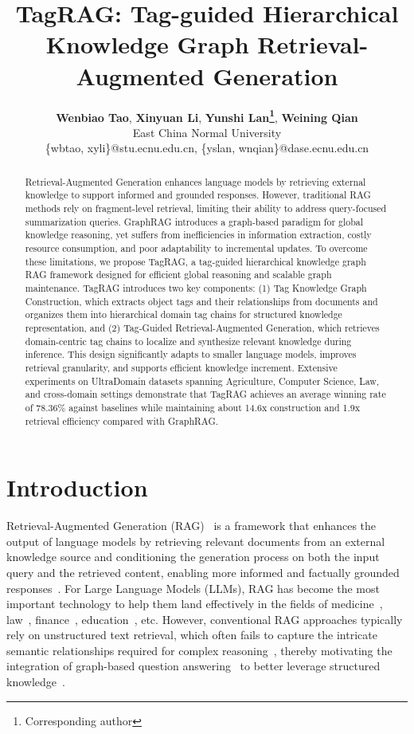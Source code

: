 \documentclass[11pt]{article}
\title{TagRAG: Tag-guided Hierarchical Knowledge Graph Retrieval-Augmented Generation}
\author{
 \textbf{Wenbiao Tao},
 \textbf{Xinyuan Li},
 \textbf{Yunshi Lan\thanks{Corresponding author}},
 \textbf{Weining Qian}
\\
 East China Normal University
\\
 \{wbtao, xyli\}@stu.ecnu.edu.cn, \{yslan, wnqian\}@dase.ecnu.edu.cn
}
\begin{document}
\maketitle


\begin{abstract}
Retrieval-Augmented Generation enhances language models by retrieving external knowledge to support informed and grounded responses. However, traditional RAG methods rely on fragment-level retrieval, limiting their ability to address query-focused summarization queries. GraphRAG introduces a graph-based paradigm for global knowledge reasoning, yet suffers from inefficiencies in information extraction, costly resource consumption, and poor adaptability to incremental updates. To overcome these limitations, we propose TagRAG, a tag-guided hierarchical knowledge graph RAG framework designed for efficient global reasoning and scalable graph maintenance. TagRAG introduces two key components: (1) Tag Knowledge Graph Construction, which extracts object tags and their relationships from documents and organizes them into hierarchical domain tag chains for structured knowledge representation, and (2) Tag-Guided Retrieval-Augmented Generation, which retrieves domain-centric tag chains to localize and synthesize relevant knowledge during inference. This design significantly adapts to smaller language models, improves retrieval granularity, and supports efficient knowledge increment. Extensive experiments on UltraDomain datasets spanning Agriculture, Computer Science, Law, and cross-domain settings demonstrate that TagRAG achieves an average winning rate of 78.36\% against baselines while maintaining about 14.6x construction and 1.9x retrieval efficiency compared with GraphRAG.
\end{abstract}





\section{Introduction}
Retrieval-Augmented Generation (RAG)~\cite{lewis2020retrieval} is a framework that enhances the output of language models by retrieving relevant documents from an external knowledge source and conditioning the generation process on both the input query and the retrieved content, enabling more informed and factually grounded responses~\cite{fan2024survey, chen2025comrag}. For Large Language Models (LLMs), RAG has become the most important technology to help them land effectively in the fields of medicine~\cite{zhao2025medrag}, law~\cite{wiratunga2024cbr}, finance~\cite{barry2025graphrag}, education~\cite{lan2025survey}, etc.
However, conventional RAG approaches typically rely on unstructured text retrieval, which often fails to capture the intricate semantic relationships required for complex reasoning~\cite{liang2024aligning}, thereby motivating the integration of graph-based question answering~\cite{tao2024finqa} to better leverage structured knowledge~\cite{zhu2025graph}.
\end{document}
